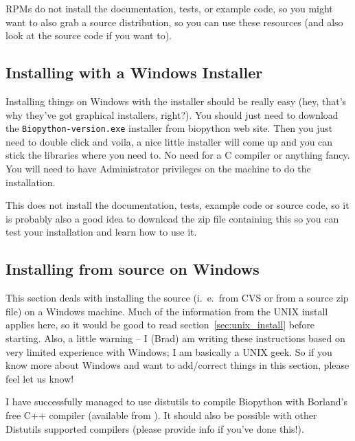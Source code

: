 \documentclass{article}
\begin{document}
RPMs do not install the documentation, tests, or example code, so you might want to also grab a source distribution, so you can use these resources (and also look at the source code if you want to).

\subsection{Installing with a Windows Installer}

Installing things on Windows with the installer should be really easy (hey, that's why they've got graphical installers, right?). You should just need to download the \verb|Biopython-version.exe| installer from biopython web site. Then you just need to double click and voila, a nice little installer will come up and you can stick the libraries where you need to. No need for a C compiler or anything fancy. You will need to have Administrator privileges on the machine to do the installation.


This does not install the documentation, tests, example code or source code, so it is probably also a good idea to download the zip file containing this so you can test your installation and learn how to use it.

\subsection{Installing from source on Windows}
\label{sec:windows_install}

This section deals with installing the source (i.~e.~from CVS or from a source zip file) on a Windows machine. Much of the information from the UNIX install applies here, so it would be good to read section~\ref{sec:unix_install} before starting. Also, a little warning -- I (Brad) am writing these instructions based on very limited experience with Windows; I am basically a UNIX geek. So if you know more about Windows and want to add/correct things in this section, please feel let us know!


I have successfully managed to use distutils to compile Biopython with Borland's free C++ compiler (available from ). It should also be possible with other Distutils supported compilers (please provide info if you've done this!).
\end{document}
